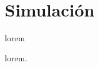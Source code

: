 \section{Simulación}

\begin{frame}{lorem}
    \begin{block}{lorem.}

    \end{block}


\end{frame}
